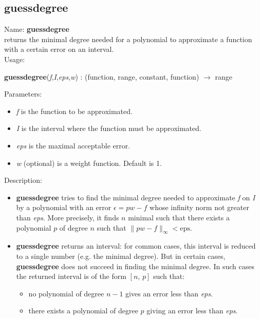 \subsection{guessdegree}
\label{labguessdegree}
\noindent Name: \textbf{guessdegree}\\
returns the minimal degree needed for a polynomial to approximate a function with a certain error on an interval.\\
\noindent Usage: 
\begin{center}
\textbf{guessdegree}(\emph{f},\emph{I},\emph{eps},\emph{w}) : (\textsf{function}, \textsf{range}, \textsf{constant}, \textsf{function}) $\rightarrow$ \textsf{range}\\
\end{center}
Parameters: 
\begin{itemize}
\item \emph{f} is the function to be approximated.
\item \emph{I} is the interval where the function must be approximated.
\item \emph{eps} is the maximal acceptable error.
\item \emph{w} (optional) is a weight function. Default is 1.
\end{itemize}
\noindent Description: \begin{itemize}

\item \textbf{guessdegree} tries to find the minimal degree needed to approximate \emph{f}
   on \emph{I} by a polynomial with an error $\epsilon=p w - f$ whose infinity norm not greater than \emph{eps}.
   More precisely, it finds $n$ minimal such that there exists a
   polynomial $p$ of degree $n$ such that $\|p w-f\|_{\infty} < \mathrm{eps}$.

\item \textbf{guessdegree} returns an interval: for common cases, this interval is reduced to a 
   single number (e.g. the minimal degree). But in certain cases, \textbf{guessdegree} does
   not succeed in finding the minimal degree. In such cases the returned interval
   is of the form $[n,\,p]$ such that:
   \begin{itemize}
   \item no polynomial of degree $n-1$ gives an error less than \emph{eps}.
   \item there exists a polynomial of degree $p$ giving an error less than \emph{eps}. 
   \end{itemize}
\end{itemize}
